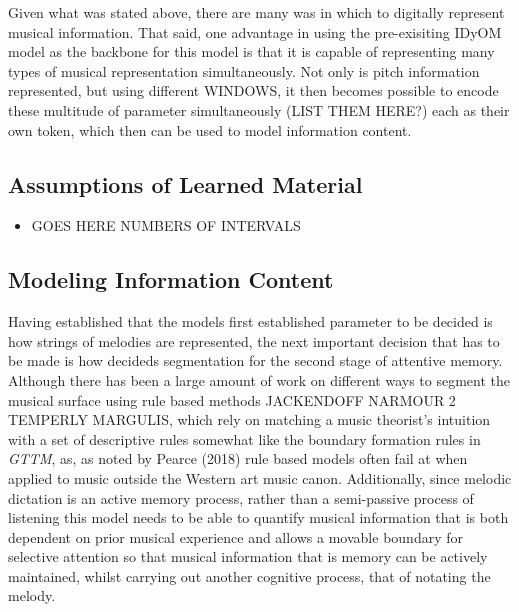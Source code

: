 \documentclass[]{book}
\providecommand{\tightlist}{%
  \setlength{\itemsep}{0pt}\setlength{\parskip}{0pt}}
\theoremstyle{definition}
\theoremstyle{definition}
\theoremstyle{definition}
\theoremstyle{remark}
\begin{document}
Given what was stated above, there are many was in which to digitally
represent musical information. That said, one advantage in using the
pre-exisiting IDyOM model as the backbone for this model is that it is
capable of representing many types of musical representation
simultaneously. Not only is pitch information represented, but using
different WINDOWS, it then becomes possible to encode these multitude of
parameter simultaneously (LIST THEM HERE?) each as their own token,
which then can be used to model information content.

\hypertarget{assumptions-of-learned-material}{%
\subsection{Assumptions of Learned
Material}\label{assumptions-of-learned-material}}

\begin{itemize}
\tightlist
\item
  GOES HERE NUMBERS OF INTERVALS
\end{itemize}

\hypertarget{modeling-information-content}{%
\subsection{Modeling Information
Content}\label{modeling-information-content}}

Having established that the models first established parameter to be
decided is how strings of melodies are represented, the next important
decision that has to be made is how decideds segmentation for the second
stage of attentive memory. Although there has been a large amount of
work on different ways to segment the musical surface using rule based
methods JACKENDOFF NARMOUR 2 TEMPERLY MARGULIS, which rely on matching a
music theorist's intuition with a set of descriptive rules somewhat like
the boundary formation rules in \emph{GTTM}, as, as noted by Pearce
(2018) rule based models often fail at when applied to music outside the
Western art music canon. Additionally, since melodic dictation is an
active memory process, rather than a semi-passive process of listening
this model needs to be able to quantify musical information that is both
dependent on prior musical experience and allows a movable boundary for
selective attention so that musical information that is memory can be
actively maintained, whilst carrying out another cognitive process, that
of notating the melody.
\end{document}
